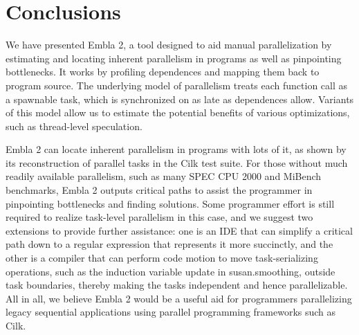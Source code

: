 \section{Conclusions}

We have presented Embla 2, a tool designed to aid manual parallelization by estimating and locating inherent parallelism in programs as well as pinpointing bottlenecks.
It works by profiling dependences and mapping them back to program source.
The underlying model of parallelism treats each function call as a spawnable task, which is synchronized on as late as dependences allow.
Variants of this model allow us to estimate the potential benefits of various optimizations, such as thread-level speculation.

Embla 2 can locate inherent parallelism in programs with lots of it,
as shown by its reconstruction of parallel tasks in the Cilk test suite.
For those without much readily available parallelism,
such as many SPEC CPU 2000 and MiBench benchmarks,
Embla 2 outputs critical paths to assist the programmer in pinpointing bottlenecks and finding solutions.
Some programmer effort is still required to realize task-level parallelism in this case,
and we suggest two extensions to provide further assistance:
one is an IDE that can simplify a critical path down to a regular expression that represents it more succinctly,
and the other is a compiler that can perform code motion to move task-serializing operations,
such as the induction variable update in \textsf{susan.smoothing}, outside task boundaries,
thereby making the tasks independent and hence parallelizable.
All in all, we believe Embla 2 would be a useful aid for programmers parallelizing legacy sequential applications using parallel programming frameworks such as Cilk.
